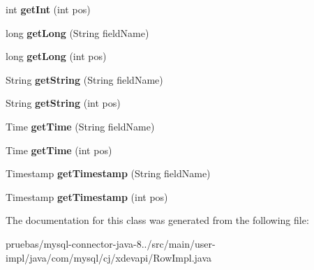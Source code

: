 \begin{DoxyCompactItemize}
int {\bfseries get\+Int} (int pos)
\item 
\mbox{\label{classcom_1_1mysql_1_1cj_1_1xdevapi_1_1_row_impl_a25f8feae26d2b3335bb3d88e1637bb1d}} 
long {\bfseries get\+Long} (String field\+Name)
\item 
\mbox{\label{classcom_1_1mysql_1_1cj_1_1xdevapi_1_1_row_impl_a796ee8178453ae784c2fe91a00b25be6}} 
long {\bfseries get\+Long} (int pos)
\item 
\mbox{\label{classcom_1_1mysql_1_1cj_1_1xdevapi_1_1_row_impl_ab6d7657c186270e1178f8fcd689c11c2}} 
String {\bfseries get\+String} (String field\+Name)
\item 
\mbox{\label{classcom_1_1mysql_1_1cj_1_1xdevapi_1_1_row_impl_a868fc79bb2f0b9f908c6673b9626778a}} 
String {\bfseries get\+String} (int pos)
\item 
\mbox{\label{classcom_1_1mysql_1_1cj_1_1xdevapi_1_1_row_impl_ab8794a81f90fded1e6ccc05704e2bc60}} 
Time {\bfseries get\+Time} (String field\+Name)
\item 
\mbox{\label{classcom_1_1mysql_1_1cj_1_1xdevapi_1_1_row_impl_a8f7deff4f0d329375f7a264051f04e29}} 
Time {\bfseries get\+Time} (int pos)
\item 
\mbox{\label{classcom_1_1mysql_1_1cj_1_1xdevapi_1_1_row_impl_a07e19f59090e74951f1c52c73c1e1d63}} 
Timestamp {\bfseries get\+Timestamp} (String field\+Name)
\item 
\mbox{\label{classcom_1_1mysql_1_1cj_1_1xdevapi_1_1_row_impl_ae938f3d1a95707b537489df90ce8d20f}} 
Timestamp {\bfseries get\+Timestamp} (int pos)
\end{DoxyCompactItemize}


The documentation for this class was generated from the following file\+:\begin{DoxyCompactItemize}
\item 
pruebas/mysql-\/connector-\/java-\/8../src/main/user-\/impl/java/com/mysql/cj/xdevapi/Row\+Impl.\+java\end{DoxyCompactItemize}
